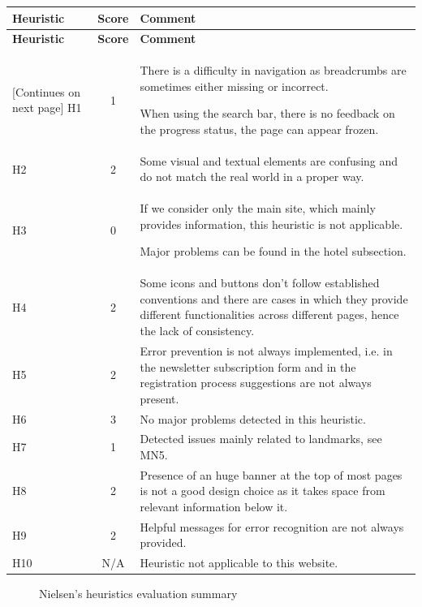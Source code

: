 \begin{tabularx}{\linewidth}{l c X}
\toprule
\textbf{Heuristic} & \textbf{Score} & \textbf{Comment} \\
\midrule
\endfirsthead
\toprule
\textbf{Heuristic} & \textbf{Score} & \textbf{Comment} \\
\midrule
\endhead
\midrule
\footnotesize [Continues on next page]
\endfoot
\bottomrule
\endlastfoot
    H1 & 1 & There is a difficulty in navigation as breadcrumbs are sometimes either missing or incorrect.\par When using the search bar, there is no feedback on the progress status, the page can appear frozen. \\ \midrule
    H2 & 2 & Some visual and textual elements are confusing and do not match the real world in a proper way.\\ \midrule
    H3 & 0 & If we consider only the main site, which mainly provides information, this heuristic is not applicable.\par Major problems can be found in the hotel subsection.\\ \midrule
    H4 & 2 & Some icons and buttons don't follow established conventions and there are cases in which they provide different functionalities across different pages, hence the lack of consistency.\\ \midrule
    H5 & 2 & Error prevention is not always implemented, i.e. in the newsletter subscription form and in the registration process suggestions are not always present.\\ \midrule
    H6 & 3 & No major problems detected in this heuristic.\\ \midrule
    H7 & 1 & Detected issues mainly related to landmarks, see MN5.\\ \midrule
    H8 & 2 & Presence of an huge banner at the top of most pages is not a good design choice as it takes space from relevant information below it.\\ \midrule
    H9 & 2 & Helpful messages for error recognition are not always provided.\\ \midrule
    H10 & N/A & Heuristic not applicable to this website.
\end{tabularx}

\begin{figure}[!ht]
    \begin{minipage}{\linewidth}
        \centering
        \caption{Nielsen's heuristics evaluation summary}
        \label{BarsNielsenCrop}
    \end{minipage}
\end{figure}

